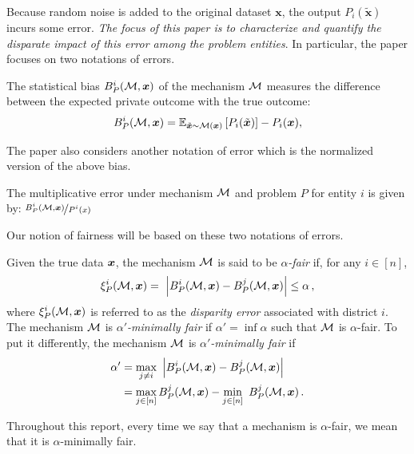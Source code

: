 Because random noise is added to the original dataset $\bm{x}$, the output $P_i(\tilde{\bm{x}})$ incurs some error. {\em The focus of this paper is to characterize and quantify the disparate impact of this error among the problem entities}. In particular, the paper focuses on two notations of errors.

\begin{definition}
	\label{def:bias}
	The statistical bias  $ B_P^i(\mathcal{M}, \bm{x}) $ of the mechanism $\mathcal{M}$ measures the difference between the expected private outcome with the true outcome:
	\begin{equation}
		\label{eq:bias}
		B_P^i(\mathcal{M}, \bm{x}) =
		\mathbb{E}_{\tilde{\bm{x}} \sim \mathcal{M}(\bm{x})} \left[ P_i(\tilde{\bm{x}}) \right] - P_i (\bm{x}),
	\end{equation}

\end{definition}

The paper also considers another notation of error which is the normalized version of the above bias.
\begin{definition}
	The multiplicative error under mechanism $\mathcal{M}$ and problem $P$ for entity $i$ is given by: $\nicefrac{B_P^i(\mathcal{M}, \bm{x})}{P^i(x)}$

\end{definition}

Our notion of fairness will be based on these two notations of errors.

\begin{definition}
	Given the true data $\bm{x}$, the mechanism $\mathcal{M}$ is said to be \emph{$\alpha$-fair} if, for any $i\in[n]$,
	\begin{equation*}
		\xi^{i}_P(\mathcal{M}, \bm{x}) = ~\left\vert  B_P^i(\mathcal{M}, \bm{x}) - B_P^j(\mathcal{M}, \bm{x})
		\right\vert\leq \alpha\,,
	\end{equation*}
	where $ \xi^{i}_P(\mathcal{M}, \bm{x})$ is referred to as the \emph{disparity error} associated with
	district $i$. The mechanism $\mathcal{M}$ is \emph{$\alpha'$-minimally fair} if $\alpha'=\inf \alpha$ such that
	$\mathcal{M}$ is $\alpha$-fair. To put it differently, the mechanism $\mathcal{M}$ is \emph{$\alpha'$-minimally fair} if
	\begin{align*}
		\alpha'& = \max_{j\neq i}~\left\vert  B_P^i(\mathcal{M}, \bm{x}) - B_P^j(\mathcal{M}, \bm{x})
		\right\vert \\
		&= \max_{j\in [n]} B_P^j(\mathcal{M}, \bm{x})   -\min_{j\in [n]}~ B_P^j(\mathcal{M}, \bm{x}) \,.
	\end{align*}
\end{definition}
Throughout this report, every time we say that a mechanism is $\alpha$-fair, we mean that
it is $\alpha$-minimally fair.


